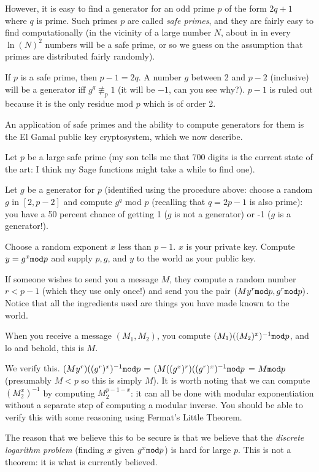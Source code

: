 \documentclass[12pt]{article}
\begin{document}
However, it is easy to find a generator for an odd prime $p$ of the form $2q+1$ where $q$ is prime.  Such primes $p$ are called {\em safe primes\/}, and they are fairly easy to find computationally (in the vicinity of a large number $N$, about in in every $\ln(N)^2$ numbers will be a safe prime, or so we guess on the assumption that primes are distributed fairly randomly).

If $p$ is a safe prime, then $p-1=2q$.  A number $g$  between 2 and $p-2$ (inclusive) will be a generator iff $g^q \not\equiv_p 1$ (it will be $-1$, can you see why?).  $p-1$ is ruled out because it is the only residue mod $p$ which is of order 2.

An application of safe primes and the ability to compute generators for them is the El Gamal public key cryptosystem, which we now describe.

Let $p$ be a large safe prime (my son tells me that 700 digits is the current state of the art:  I think my Sage functions might take a while to find one).

Let $g$ be a generator for $p$ (identified using the procedure above:  choose a random $g$ in $[2,p-2]$ and compute $g^q$ mod $p$ (recalling that $q=2p-1$ is also prime):  you have a 50 percent chance of getting 1 ($g$ is not a generator) or -1 ($g$ is a generator!).

Choose a random exponent $x$ less than $p-1$.  $x$ is your private key.  Compute $y=g^x {\tt mod} p$ and supply $p, g$, and $y$ to the world as your public key.

If someone wishes to send you a message $M$, they compute a random number $r<p-1$ (which they use only once!) and send you the pair $(My^r {\tt mod} p,g^r{\tt mod}p)$.  Notice that all the ingredients used are things you have made known to the world.

When you receive a message $(M_1,M_2)$, you compute $(M_1)((M_2)^{x})^{-1}{\tt mod}p$, and lo and behold, this is $M$.

We verify this.  $(My^r)((g^r)^{x})^{-1}{\tt mod}p$ = $(M((g^x)^r)((g^r)^x)^{-1}{\tt mod}p$ = $M{\tt mod} p$ (presumably $M <p$ so this is simply $M$).  It is worth noting
that we can compute $(M_2^x)^{-1}$ by computing $M_2^{p-1-x}$:  it can all be done with modular exponentiation without a separate step of computing a modular inverse.  You should be able to verify this with some reasoning using Fermat's Little Theorem.

The reason that we believe this to be secure is that we believe that the {\em discrete logarithm problem\/} (finding $x$ given $g^x {\tt mod} p$) is hard for large $p$.  This is not a theorem:  it is what is currently believed.
\end{document}
